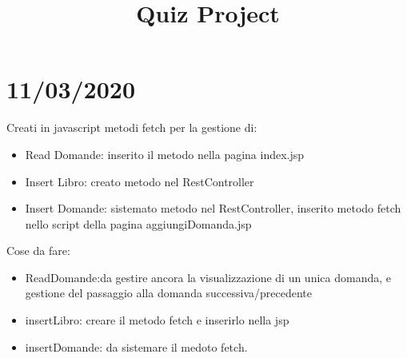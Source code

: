 \documentclass[12pt, a4paper]{article}
\title {Quiz Project}
\begin{document}
\maketitle

\section{11/03/2020}
Creati in javascript metodi fetch per la gestione di:
\begin{itemize}
\item Read Domande: inserito il metodo nella pagina index.jsp
\item Insert Libro: creato metodo nel RestController
\item Insert Domande: sistemato metodo nel RestController, inserito metodo fetch nello script della pagina aggiungiDomanda.jsp

\end{itemize}

Cose da fare:
\begin{itemize}
\item ReadDomande:da gestire ancora la visualizzazione di un unica domanda, e gestione del passaggio alla domanda successiva/precedente
\item insertLibro: creare il metodo fetch e inserirlo nella jsp
\item insertDomande: da sistemare il medoto fetch.
\end{itemize}
\end{document}
